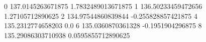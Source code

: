 0 137.0145263671875 1.7832489013671875
1 136.50233459472656 1.27105712890625
2 134.97544860839844 -0.255828857421875
4 135.2312774658203 0.0
6 135.0360870361328 -0.1951904296875
8 135.29086303710938 0.0595855712890625

